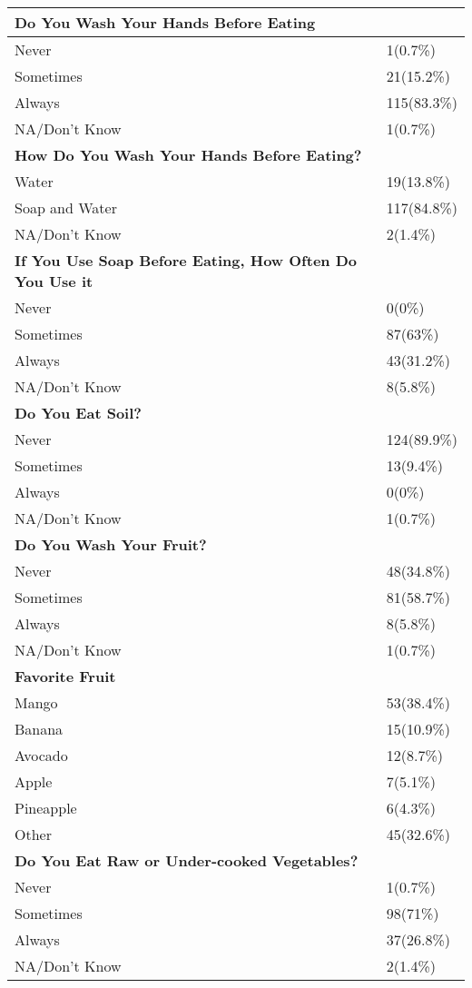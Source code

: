 \documentclass[6pt,letterpaper]{article}
\begin{document}
\begin{tabular}{|l  l|}
\hline
\textbf{Do You Wash Your Hands Before Eating} \\
\hline
Never & 1(0.7\%) \\
Sometimes & 21(15.2\%) \\
Always & 115(83.3\%) \\
NA/Don't Know & 1(0.7\%) \\
\hline
\textbf{How Do You Wash Your Hands Before Eating?} \\
\hline
Water & 19(13.8\%) \\
Soap and Water & 117(84.8\%) \\
NA/Don't Know & 2(1.4\%) \\
\hline
\textbf{If You Use Soap Before Eating, How Often Do You Use it} \\ 
\hline
Never & 0(0\%) \\
Sometimes & 87(63\%) \\
Always & 43(31.2\%) \\
NA/Don't Know & 8(5.8\%) \\
\hline
\textbf{Do You Eat Soil?} \\
\hline
Never & 124(89.9\%) \\
Sometimes & 13(9.4\%) \\
Always & 0(0\%) \\
NA/Don't Know & 1(0.7\%) \\
\hline
\textbf{Do You Wash Your Fruit?} \\
\hline
Never & 48(34.8\%) \\
Sometimes & 81(58.7\%) \\
Always & 8(5.8\%) \\
NA/Don't Know & 1(0.7\%) \\
\hline
\textbf{Favorite Fruit} \\
\hline
Mango & 53(38.4\%) \\
Banana & 15(10.9\%) \\
Avocado & 12(8.7\%) \\
Apple & 7(5.1\%) \\
Pineapple & 6(4.3\%) \\
Other & 45(32.6\%) \\
\hline
\textbf{Do You Eat Raw or Under-cooked Vegetables?} \\
\hline
Never & 1(0.7\%) \\
Sometimes & 98(71\%) \\
Always & 37(26.8\%) \\
NA/Don't Know & 2(1.4\%) \\

\end{tabular}
\end{document}
